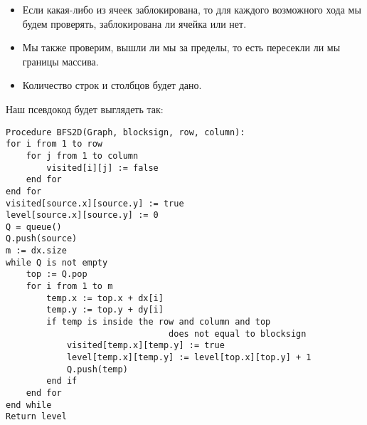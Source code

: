 \begin{itemize}
    \item Если какая-либо из ячеек заблокирована, то для каждого возможного хода мы будем проверять, заблокирована ли ячейка или нет.
    \item Мы также проверим, вышли ли мы за пределы, то есть пересекли ли мы границы массива.
    \item Количество строк и столбцов будет дано.
\end{itemize}

Наш псевдокод будет выглядеть так:

\begin{tcolorbox}
\begin{verbatim}
Procedure BFS2D(Graph, blocksign, row, column): 
for i from 1 to row    
	for j from 1 to column        
		visited[i][j] := false    
	end for 
end for 
visited[source.x][source.y] := true 
level[source.x][source.y] := 0 
Q = queue() 
Q.push(source) 
m := dx.size 
while Q is not empty    
	top := Q.pop    
	for i from 1 to m
		temp.x := top.x + dx[i]        
		temp.y := top.y + dy[i]        
		if temp is inside the row and column and top 
		                        does not equal to blocksign
			visited[temp.x][temp.y] := true            
			level[temp.x][temp.y] := level[top.x][top.y] + 1            
			Q.push(temp)
        end if
    end for
end while
Return level
\end{verbatim}
\end{tcolorbox}